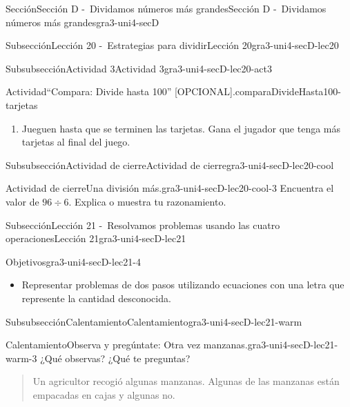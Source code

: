 \documentclass[twoside,10pt,]{article}
\begin{document}
\begin{sectionptx}{Sección}{Sección D -~Dividamos números más grandes}{}{Sección D -~Dividamos números más grandes}{}{}{gra3-uni4-secD}
\begin{subsectionptx}{Subsección}{Lección 20 -~Estrategias para dividir}{}{Lección 20}{}{}{gra3-uni4-secD-lec20}
\begin{subsubsectionptx}{Subsubsección}{Actividad 3}{}{Actividad 3}{}{}{gra3-uni4-secD-lec20-act3}
\begin{activity}{Actividad}{“Compara: Divide hasta 100” [OPCIONAL].}{comparaDivideHasta100-tarjetas}
\begin{enumerate}
\item{}Jueguen hasta que se terminen las tarjetas. Gana el jugador que tenga más tarjetas al final del juego.%
\end{enumerate}
\end{activity}%
\end{subsubsectionptx}
%
%
\typeout{************************************************}
\typeout{************************************************}
%
\begin{subsubsectionptx}{Subsubsección}{Actividad de cierre}{}{Actividad de cierre}{}{}{gra3-uni4-secD-lec20-cool}
\begin{project}{Actividad de cierre}{Una división más.}{gra3-uni4-secD-lec20-cool-3}%
Encuentra el valor de \(96 \div 6\). Explica o muestra tu razonamiento.%
\end{project}%
\end{subsubsectionptx}
\end{subsectionptx}
%
%
\typeout{************************************************}
\typeout{************************************************}
%
\begin{subsectionptx}{Subsección}{Lección 21 -~Resolvamos problemas usando las cuatro operaciones}{}{Lección 21}{}{}{gra3-uni4-secD-lec21}
\begin{objectives}{Objetivos}{gra3-uni4-secD-lec21-4}
%
\begin{itemize}[label=\textbullet]
\item{}Representar problemas de dos pasos utilizando ecuaciones con una letra que represente la cantidad desconocida.%
\end{itemize}
\end{objectives}
%
%
\typeout{************************************************}
\typeout{************************************************}
%
\begin{subsubsectionptx}{Subsubsección}{Calentamiento}{}{Calentamiento}{}{}{gra3-uni4-secD-lec21-warm}
\begin{exploration}{Calentamiento}{Observa y pregúntate: Otra vez manzanas.}{gra3-uni4-secD-lec21-warm-3}%
¿Qué observas? ¿Qué te preguntas?%
\par
\begin{quote}%
Un agricultor recogió algunas manzanas. Algunas de las manzanas están empacadas en cajas y algunas no.\end{quote}
%

\end{exploration}
\end{subsubsectionptx}
\end{subsectionptx}
\end{sectionptx}
\end{document}
